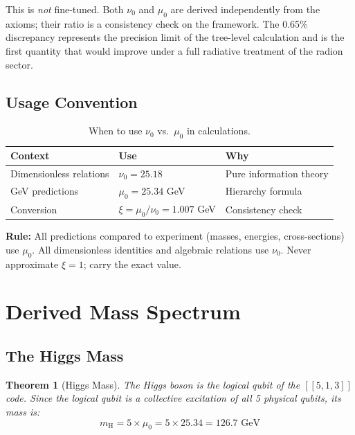 \documentclass[11pt,a4paper]{article}
\newtheorem{theorem}{Theorem}[section]
\theoremstyle{definition}
\theoremstyle{remark}
\newcommand{\murad}{\mu_0}
\newcommand{\nurad}{\nu_0}
\newcommand{\mH}{m_\mathrm{H}}
\begin{document}
This is \emph{not} fine-tuned. Both $\nurad$ and $\murad$ are derived independently from the axioms; their ratio is a consistency check on the framework. The 0.65\% discrepancy represents the precision limit of the tree-level calculation and is the first quantity that would improve under a full radiative treatment of the radion sector.

\subsection{Usage Convention}

\begin{table}[H]
\centering
\begin{tabular}{lll}
\toprule
\textbf{Context} & \textbf{Use} & \textbf{Why} \\
\midrule
Dimensionless relations & $\nurad = 25.18$ & Pure information theory \\
GeV predictions & $\murad = 25.34$ GeV & Hierarchy formula \\
Conversion & $\xi = \murad/\nurad = 1.007$ GeV & Consistency check \\
\bottomrule
\end{tabular}
\caption{When to use $\nurad$ vs.\ $\murad$ in calculations.}
\label{tab:convention}
\end{table}

\textbf{Rule:} All predictions compared to experiment (masses, energies, cross-sections) use $\murad$. All dimensionless identities and algebraic relations use $\nurad$. Never approximate $\xi = 1$; carry the exact value.

\section{Derived Mass Spectrum}
\label{sec:masses}

\subsection{The Higgs Mass}

\begin{theorem}[Higgs Mass]
\label{thm:higgs}
The Higgs boson is the logical qubit of the $[[5,1,3]]$ code. Since the logical qubit is a collective excitation of all 5 physical qubits, its mass is:
\begin{equation}
\boxed{\mH = 5 \times \murad = 5 \times 25.34 = 126.7 \text{ GeV}}
\end{equation}
\end{theorem}
\end{document}
